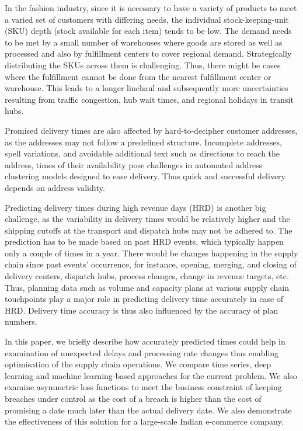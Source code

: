 \documentclass[twoside,leqno,twocolumn]{article}
\begin{document}
In the fashion industry, since it is necessary to have a variety of products to meet a varied set of customers with differing needs, the individual stock-keeping-unit (SKU) depth (stock available for each item) tends to be low. The demand needs to be met by a small number of warehouses where goods are stored as well as processed and also by fulfillment centers to cover regional demand. Strategically distributing the SKUs across them is challenging. Thus, there might be cases where the fulfillment cannot be done from the nearest fulfillment center or warehouse. This leads to a longer linehaul and subsequently more uncertainties resulting from traffic congestion, hub wait times, and regional holidays in transit hubs. 

Promised delivery times are also affected by hard-to-decipher customer addresses, as the addresses may not follow a predefined structure. Incomplete addresses, spell variations, and avoidable additional text such as directions to reach the address, times of their availability pose challenges in automated address clustering models\cite{10.1145/2837689.2837696} designed to ease delivery. Thus quick and successful delivery depends on address validity.

Predicting delivery times during high revenue days (HRD) is another big challenge, as the variability in delivery times would be relatively higher and the shipping cutoffs at the transport and dispatch hubs may not be adhered to. The prediction has to be made based on past HRD events, which typically happen only a couple of times in a year. There would be changes happening in the supply chain since past events' occurrence, for instance, opening, merging, and closing of delivery centers, dispatch hubs, process changes, change in revenue targets, etc. Thus, planning data such as volume and capacity plans at various supply chain touchpoints play a major role in predicting delivery time accurately in case of HRD. Delivery time accuracy is thus also influenced by the accuracy of plan numbers.


In this paper, we briefly describe how accurately predicted times could help in examination of unexpected delays and processing rate changes thus enabling optimisation of the supply chain operations. We compare time series, deep learning and machine learning-based approaches for the current problem. We also examine asymmetric loss functions to meet the business constraint of keeping breaches under control as the cost of a breach is higher than the cost of promising a date much later than the actual delivery date. We also demonstrate the effectiveness of this solution for a large-scale Indian e-commerce company.
\end{document}
